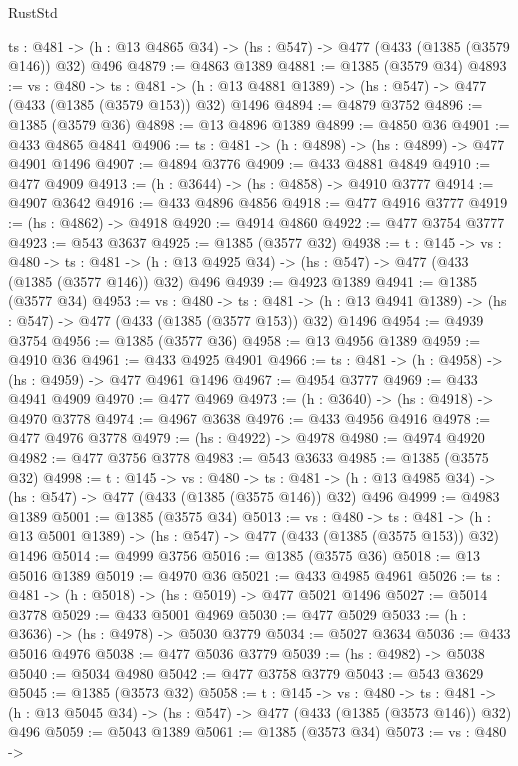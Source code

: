 \begin{lexlean}{RustStd}
\begin{coremodule}
{\begin{coremodule}
{{{{{{{{{{{{{{{{  {ts : @481} -> (h : @13 @4865 @34) -> (hs : @547) -> @477 (@433 (@1385 (@3579 @146)) @32) @496
@4879 := @4863 @1389
@4881 := @1385 (@3579 @34)
@4893 := {vs : @480} ->
  {ts : @481} -> (h : @13 @4881 @1389) -> (hs : @547) -> @477 (@433 (@1385 (@3579 @153)) @32) @1496
@4894 := @4879 @3752
@4896 := @1385 (@3579 @36)
@4898 := @13 @4896 @1389
@4899 := @4850 @36
@4901 := @433 @4865 @4841
@4906 := {ts : @481} -> (h : @4898) -> (hs : @4899) -> @477 @4901 @1496
@4907 := @4894 @3776
@4909 := @433 @4881 @4849
@4910 := @477 @4909
@4913 := (h : @3644) -> (hs : @4858) -> @4910 @3777
@4914 := @4907 @3642
@4916 := @433 @4896 @4856
@4918 := @477 @4916 @3777
@4919 := (hs : @4862) -> @4918
@4920 := @4914 @4860
@4922 := @477 @3754 @3777
@4923 := @543 @3637
@4925 := @1385 (@3577 @32)
@4938 := {t : @145} ->
  {vs : @480} ->
  {ts : @481} -> (h : @13 @4925 @34) -> (hs : @547) -> @477 (@433 (@1385 (@3577 @146)) @32) @496
@4939 := @4923 @1389
@4941 := @1385 (@3577 @34)
@4953 := {vs : @480} ->
  {ts : @481} -> (h : @13 @4941 @1389) -> (hs : @547) -> @477 (@433 (@1385 (@3577 @153)) @32) @1496
@4954 := @4939 @3754
@4956 := @1385 (@3577 @36)
@4958 := @13 @4956 @1389
@4959 := @4910 @36
@4961 := @433 @4925 @4901
@4966 := {ts : @481} -> (h : @4958) -> (hs : @4959) -> @477 @4961 @1496
@4967 := @4954 @3777
@4969 := @433 @4941 @4909
@4970 := @477 @4969
@4973 := (h : @3640) -> (hs : @4918) -> @4970 @3778
@4974 := @4967 @3638
@4976 := @433 @4956 @4916
@4978 := @477 @4976 @3778
@4979 := (hs : @4922) -> @4978
@4980 := @4974 @4920
@4982 := @477 @3756 @3778
@4983 := @543 @3633
@4985 := @1385 (@3575 @32)
@4998 := {t : @145} ->
  {vs : @480} ->
  {ts : @481} -> (h : @13 @4985 @34) -> (hs : @547) -> @477 (@433 (@1385 (@3575 @146)) @32) @496
@4999 := @4983 @1389
@5001 := @1385 (@3575 @34)
@5013 := {vs : @480} ->
  {ts : @481} -> (h : @13 @5001 @1389) -> (hs : @547) -> @477 (@433 (@1385 (@3575 @153)) @32) @1496
@5014 := @4999 @3756
@5016 := @1385 (@3575 @36)
@5018 := @13 @5016 @1389
@5019 := @4970 @36
@5021 := @433 @4985 @4961
@5026 := {ts : @481} -> (h : @5018) -> (hs : @5019) -> @477 @5021 @1496
@5027 := @5014 @3778
@5029 := @433 @5001 @4969
@5030 := @477 @5029
@5033 := (h : @3636) -> (hs : @4978) -> @5030 @3779
@5034 := @5027 @3634
@5036 := @433 @5016 @4976
@5038 := @477 @5036 @3779
@5039 := (hs : @4982) -> @5038
@5040 := @5034 @4980
@5042 := @477 @3758 @3779
@5043 := @543 @3629
@5045 := @1385 (@3573 @32)
@5058 := {t : @145} ->
  {vs : @480} ->
  {ts : @481} -> (h : @13 @5045 @34) -> (hs : @547) -> @477 (@433 (@1385 (@3573 @146)) @32) @496
@5059 := @5043 @1389
@5061 := @1385 (@3573 @34)
@5073 := {vs : @480} ->
}}}}}}}}}}}}}}}}
\end{coremodule}}
\end{coremodule}
\end{lexlean}
